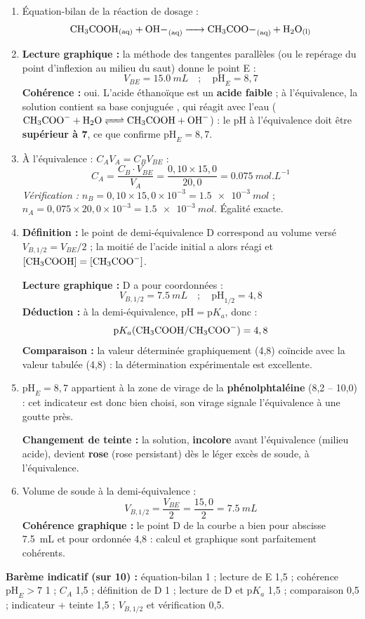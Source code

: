 \documentclass[11pt]{article}
\begin{document}
\begin{corrige}
\begin{enumerate}
\item Équation-bilan de la réaction de dosage :
\[ \ce{CH3COOH_{(aq)} + OH-_{(aq)} -> CH3COO-_{(aq)} + H2O_{(l)}} \]

\item \textbf{Lecture graphique :} la méthode des tangentes parallèles (ou le repérage du point d'inflexion au milieu du saut) donne le point E :
\[ \boxed{V_{BE} = \SI{15,0}{mL} \quad ; \quad \mathrm{pH}_E = 8,7} \]
\textbf{Cohérence :} oui. L'acide éthanoïque est un \textbf{acide faible} ; à l'équivalence, la solution contient sa base conjuguée , qui réagit avec l'eau ($\ce{CH3COO- + H2O <=> CH3COOH + OH-}$) : le pH à l'équivalence doit être \textbf{supérieur à 7}, ce que confirme $\mathrm{pH}_E = 8,7$.

\item À l'équivalence : $C_A V_A = C_B V_{BE}$ :
\[ C_A = \frac{C_B \cdot V_{BE}}{V_A} = \frac{0,10 \times 15,0}{20,0} = \SI{0,075}{mol.L^{-1}} \]
\emph{Vérification :} $n_B = 0,10 \times 15,0 \times 10^{-3} = \SI{1,5e-3}{mol}$ ; $n_A = 0,075 \times 20,0 \times 10^{-3} = \SI{1,5e-3}{mol}$. Égalité exacte.

\item \textbf{Définition :} le point de demi-équivalence D correspond au volume versé $V_{B,1/2} = V_{BE}/2$ ; la moitié de l'acide initial a alors réagi et $[\ce{CH3COOH}] = [\ce{CH3COO-}]$.

\textbf{Lecture graphique :} D a pour coordonnées :
\[ V_{B,1/2} = \SI{7,5}{mL} \quad ; \quad \mathrm{pH}_{1/2} = 4,8 \]
\textbf{Déduction :} à la demi-équivalence, $\mathrm{pH} = \mathrm{p}K_a$, donc :
\[ \mathrm{p}K_a(\ce{CH3COOH}/\ce{CH3COO-}) = 4,8 \]
\textbf{Comparaison :} la valeur déterminée graphiquement (4,8) coïncide avec la valeur tabulée (4,8) : la détermination expérimentale est excellente.

\item $\mathrm{pH}_E = 8,7$ appartient à la zone de virage de la \textbf{phénolphtaléine} (8,2 -- 10,0) : cet indicateur est donc bien choisi, son virage signale l'équivalence à une goutte près.

\textbf{Changement de teinte :} la solution, \textbf{incolore} avant l'équivalence (milieu acide), devient \textbf{rose} (rose persistant) dès le léger excès de soude, à l'équivalence.

\item Volume de soude à la demi-équivalence :
\[ V_{B,1/2} = \frac{V_{BE}}{2} = \frac{15,0}{2} = \SI{7,5}{mL} \]
\textbf{Cohérence graphique :} le point D de la courbe a bien pour abscisse \SI{7,5}{mL} et pour ordonnée 4,8 : calcul et graphique sont parfaitement cohérents.
\end{enumerate}

\textbf{Barème indicatif (sur 10) :} équation-bilan 1 ; lecture de E 1,5 ; cohérence $\mathrm{pH}_E > 7$ 1 ; $C_A$ 1,5 ; définition de D 1 ; lecture de D et $\mathrm{p}K_a$ 1,5 ; comparaison 0,5 ; indicateur + teinte 1,5 ; $V_{B,1/2}$ et vérification 0,5.
\end{corrige}
\end{document}
